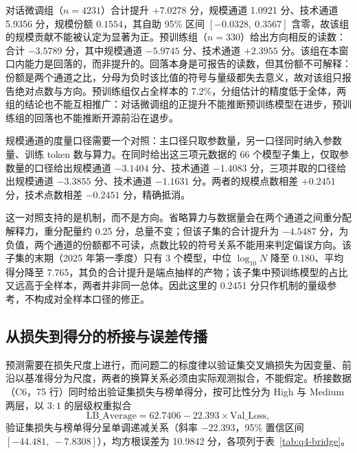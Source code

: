 对话微调组（$n=4231$）合计提升 $+7.0278$ 分，规模通道 1.0921 分、技术通道 5.9356 分，规模份额 $0.1554$，其自助 95\% 区间 $[-0.0328,\ 0.3567]$ 含零，故该组的规模贡献不能被认定为显著为正。预训练组（$n=330$）给出方向相反的读数：合计 $-3.5789$ 分，其中规模通道 $-5.9745$ 分、技术通道 $+2.3955$ 分。该组在本窗口内能力是回落的，而非提升的。回落本身是可报告的读数，但其份额不可解释：份额是两个通道之比，分母为负时该比值的符号与量级都失去意义，故对该组只报告绝对点数与方向。预训练组仅占全样本的 7.2\%，分组估计的精度低于全体，两组的结论也不能互相推广：对话微调组的正提升不能推断预训练模型在进步，预训练组的回落也不能推断开源前沿在退步。

规模通道的度量口径需要一个对照：主口径只取参数量，另一口径同时纳入参数量、训练 token 数与算力。在同时给出这三项元数据的 66 个模型子集上，仅取参数量的口径给出规模通道 $-3.1404$ 分、技术通道 $-1.4083$ 分，三项并取的口径给出规模通道 $-3.3855$ 分、技术通道 $-1.1631$ 分。两者的规模点数相差 $+0.2451$ 分，技术点数相差 $-0.2451$ 分，精确抵消。

这一对照支持的是机制，而不是方向。省略算力与数据量会在两个通道之间重分配解释力，重分配量约 0.25 分，总量不变；但该子集的合计提升为 $-4.5487$ 分，为负值，两个通道的份额都不可读，点数比较的符号关系不能用来判定偏误方向。该子集的末期（2025 年第一季度）只有 3 个模型，中位 $\log_{10} N$ 降至 0.180、平均得分降至 7.765，其负的合计提升是端点抽样的产物；该子集中预训练模型的占比又远高于全样本，两者并非同一总体。因此这里的 0.2451 分只作机制的量级参考，不构成对全样本口径的修正。

\subsection{从损失到得分的桥接与误差传播}
\label{subsec:q4-bridge}

预测需要在损失尺度上进行，而问题二的标度律以验证集交叉熵损失为因变量、前沿以基准得分为尺度，两者的换算关系必须由实际观测拟合，不能假定。桥接数据（C6，75 行）同时给出验证集损失与榜单得分，按可比性分为 High 与 Medium 两层，以 $3:1$ 的层级权重拟合
\begin{equation}
  \text{LB\_Average} = 62.7406 - 22.393 \times \text{Val\_Loss},
  \label{eq:q4-bridge}
\end{equation}
验证集损失与榜单得分呈单调递减关系（斜率 $-22.393$，95\% 置信区间 $[-44.481,\ -7.8308]$），均方根误差为 10.9842 分，各项列于表~\ref{tab:q4-bridge}。

